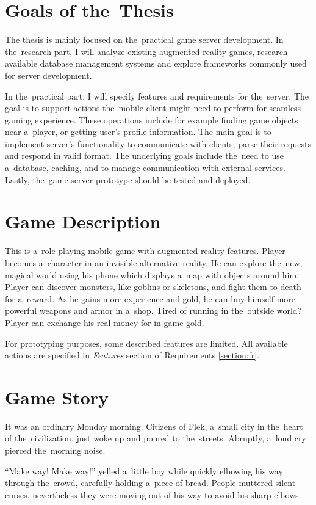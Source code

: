 \section{Goals of the~Thesis}
The thesis is mainly focused on the~practical game server development. In the~research part, I will analyze existing augmented reality games, research available database management systems and explore frameworks commonly used for server development.

In the~practical part, I will specify features and requirements for the~server. The goal is to support actions the~mobile client might need to perform for seamless gaming experience. These operations include for example finding game objects near a~player, or getting user's profile information. The main goal is to implement server's functionality to communicate with clients, parse their requests and respond in valid format. The underlying goals include the~need to use a~database, caching, and to manage communication with external services. Lastly, the~game server prototype should be tested and deployed.	

\section{Game Description}
This is a~role-playing mobile game with augmented reality features. Player becomes a~character in an invisible alternative reality. He can explore the~new, magical world using his phone which displays a~map with objects around him. Player can discover monsters, like goblins or skeletons, and fight them to death for a~reward. As he gains more experience and gold, he can buy himself more powerful weapons and armor in a~shop. Tired of running in the~outside world? Player can exchange his real money for in-game gold.

For prototyping purposes, some described features are limited. All available actions are specified in \textit{Features} section of Requirements \ref{section:fr}.

\section{Game Story}
It was an ordinary Monday morning. Citizens of Flek, a~small city in the~heart of the~civilization, just woke up and poured to the~streets. Abruptly, a~loud cry pierced the~morning noise. 

“Make way! Make way!” yelled a~little boy while quickly elbowing his way through the~crowd, carefully holding a~piece of bread. People muttered silent curses, nevertheless they were moving out of his way to avoid his sharp elbows.

